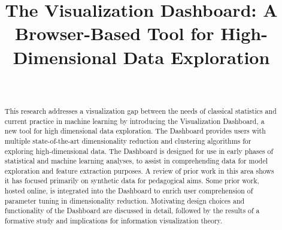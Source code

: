 \documentclass{sigchi}
\def\plaintitle{The Visualization Dashboard: A Browser-Based Tool for High-Dimensional Data Exploration}
\begin{document}
\title{\plaintitle}

\author{%
  \\
}

\maketitle%

\begin{abstract}
This research addresses a visualization gap between the needs of classical statistics and current practice in machine learning by introducing the Visualization Dashboard, a new tool for high dimensional data exploration. %
%
The Dashboard provides users with multiple state-of-the-art dimensionality reduction and clustering algorithms for exploring high-dimensional data. %
%
The Dashboard is designed for use in early phases of statistical and machine learning analyses, to assist in comprehending data for model exploration and feature extraction purposes. %
%
A review of prior work in this area shows it has focused primarily on synthetic data for pedagogical aims. %
%
Some prior work, hosted online, is integrated into the Dashboard to enrich user comprehension of parameter tuning in dimensionality reduction. %
%
Motivating design choices and functionality of the Dashboard are discussed in detail, followed by the results of a formative study and implications for information visualization theory.
\end{abstract}%
%
%
%
\end{document}
